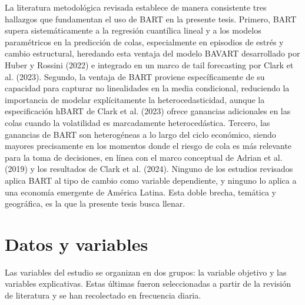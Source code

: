﻿\documentclass[11pt,a4paper]{article}
\begin{document}
La literatura metodológica revisada establece de manera consistente tres hallazgos que fundamentan el uso de BART en la presente tesis. Primero, BART supera sistemáticamente a la regresión cuantílica lineal y a los modelos paramétricos en la predicción de colas, especialmente en episodios de estrés y cambio estructural, heredando esta ventaja del modelo BAVART desarrollado por Huber y Rossini (2022) e integrado en un marco de tail forecasting por Clark et al. (2023). Segundo, la ventaja de BART proviene específicamente de su capacidad para capturar no linealidades en la media condicional, reduciendo la importancia de modelar explícitamente la heterocedasticidad, aunque la especificación hBART de Clark et al. (2023) ofrece ganancias adicionales en las colas cuando la volatilidad es marcadamente heterocedástica. Tercero, las ganancias de BART son heterogéneas a lo largo del ciclo económico, siendo mayores precisamente en los momentos donde el riesgo de cola es más relevante para la toma de decisiones, en línea con el marco conceptual de Adrian et al. (2019) y los resultados de Clark et al. (2024). Ninguno de los estudios revisados aplica BART al tipo de cambio como variable dependiente, y ninguno lo aplica a una economía emergente de América Latina. Esta doble brecha, temática y geográfica, es la que la presente tesis busca llenar.



\section{Datos y variables}
Las variables del estudio se organizan en dos grupos: la variable objetivo y las variables explicativas. Estas últimas fueron seleccionadas a partir de la revisión de literatura y se han recolectado en frecuencia diaria.
\end{document}
